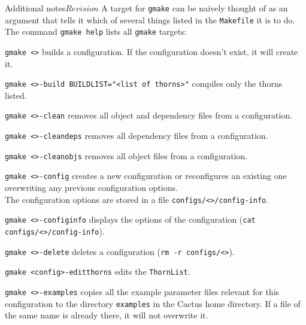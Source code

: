 \begin{cactuspart}{Additional notes}{}{$Revision$}
A target for \texttt{gmake} can be naively thought of as an argument
that tells it which of several things listed in the \texttt{Makefile} it
is to do. The command \texttt{gmake help} lists all \texttt{gmake} targets:

\begin{Lentry}

\item [\texttt{gmake <\var{config}>}]
        builds a configuration. If the configuration doesn't exist,
        it will create it.

\item [\texttt{gmake <\var{config}>-build BUILDLIST="<list of thorns>"}]
compiles only the thorns listed.

\item [\texttt{gmake <\var{config}>-clean}] removes all object and dependency
files from a configuration.

\item [\texttt{gmake <\var{config}>-cleandeps}] removes all dependency files
from a configuration.

\item [\texttt{gmake <\var{config}>-cleanobjs}] removes all object files from
  a configuration.

\item [\texttt{gmake <\var{config}>-config}] creates a new configuration or
reconfigures an existing one overwriting any previous configuration options.\\
The configuration options are stored in a file
\texttt{configs/<>/config-info}.

\item [\texttt{gmake <\var{config}>-configinfo}] displays the options
of the configuration (\texttt{cat configs/<>/config-info}).

\item [\texttt{gmake <\var{config}>-delete}] deletes a configuration
(\texttt{rm -r configs/<>}).

\item [\texttt{gmake <config>-editthorns}] edits the \texttt{ThornList}.

\item [\texttt{gmake <\var{config}>-examples}] copies all the example parameter files relevant for this configuration to the directory \texttt{examples} in the Cactus home directory. If a file of the same name is already there, it will not overwrite it.


\end{Lentry}
\end{cactuspart}
